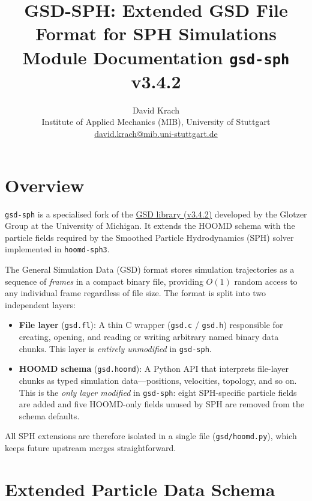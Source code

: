 \documentclass[10pt,a4paper]{article}
\title{\textbf{GSD-SPH: Extended GSD File Format for SPH Simulations}\\[4pt]
       \large Module Documentation \quad \texttt{gsd-sph} v3.4.2}
\author{David Krach\\[2pt]
        Institute of Applied Mechanics (MIB), University of Stuttgart\\
        \href{mailto:david.krach@mib.uni-stuttgart.de}%
             {david.krach@mib.uni-stuttgart.de}}
\date{}
\begin{document}
\maketitle
\thispagestyle{empty}

\section{Overview}

\texttt{gsd-sph} is a specialised fork of the
\href{https://github.com/glotzerlab/gsd}{GSD library (v3.4.2)} developed by
the Glotzer Group at the University of Michigan.  It extends the HOOMD schema
with the particle fields required by the Smoothed Particle Hydrodynamics (SPH)
solver implemented in \texttt{hoomd-sph3}.

The General Simulation Data (GSD) format stores simulation trajectories as a
sequence of \emph{frames} in a compact binary file, providing $O(1)$ random
access to any individual frame regardless of file size.  The format is split
into two independent layers:

\begin{itemize}[itemsep=2pt]
  \item \textbf{File layer} (\texttt{gsd.fl}): A thin C wrapper
        (\texttt{gsd.c} / \texttt{gsd.h}) responsible for creating, opening,
        and reading or writing arbitrary named binary data chunks.  This layer
        is \emph{entirely unmodified} in \texttt{gsd-sph}.
  \item \textbf{HOOMD schema} (\texttt{gsd.hoomd}): A Python API that
        interprets file-layer chunks as typed simulation data---positions,
        velocities, topology, and so on.  This is the \emph{only layer
        modified} in \texttt{gsd-sph}: eight SPH-specific particle fields are
        added and five HOOMD-only fields unused by SPH are removed from the
        schema defaults.
\end{itemize}

All SPH extensions are therefore isolated in a single file (\texttt{gsd/hoomd.py}),
which keeps future upstream merges straightforward.

\section{Extended Particle Data Schema}
\end{document}
